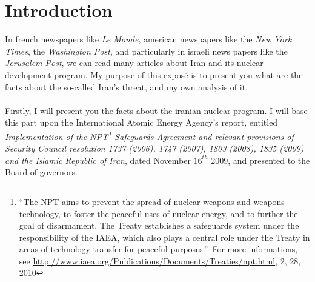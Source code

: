\documentclass[10pt,a4paper]{scrartcl} %
\title{\rmfamily\normalfont\spacedallcaps{
The so-called Iran's threat%
}}
\subtitle{\rmfamily\normalfont\spacedallcaps{
Facts and analysis
}}
\author{\spacedlowsmallcaps{
Alexandre Krispin    %
  }}
\begin{document}
\maketitle




\tableofcontents




\section{Introduction}

In french newspapers like \emph{Le Monde}, american newspapers like the \emph{New York Times}, the \emph{Washington Post}, and particularly in israeli news papers like the \emph{Jerusalem Post}, we can read many articles about Iran and its nuclear development program. My purpose of this exposé is to present you what are the facts about the so-called Iran's threat, and my own analysis of it.
\paragraph{}
Firstly, I will present you the facts about the iranian nuclear program. I will base this part upon the International Atomic Energy Agency's report, entitled \emph{Implementation of the NPT\footnote{\textquotedblleft The NPT aims to prevent the spread of nuclear weapons and weapons technology, to foster the peaceful uses of nuclear energy, and to further the goal of disarmament. The Treaty establishes a safeguards system under the responsibility of the IAEA, which also plays a central role under the Treaty in areas of technology transfer for peaceful purposes.\textquotedblright~For more informations, see \url{http://www.iaea.org/Publications/Documents/Treaties/npt.html}, 2, 28, 2010} Safeguards Agreement and relevant provisions of Security Council resolution 1737 (2006), 1747 (2007), 1803 (2008), 1835 (2009) and the Islamic Republic of Iran}, dated November $16^{th}$ 2009, and presented to the Board of governors.
\end{document}
